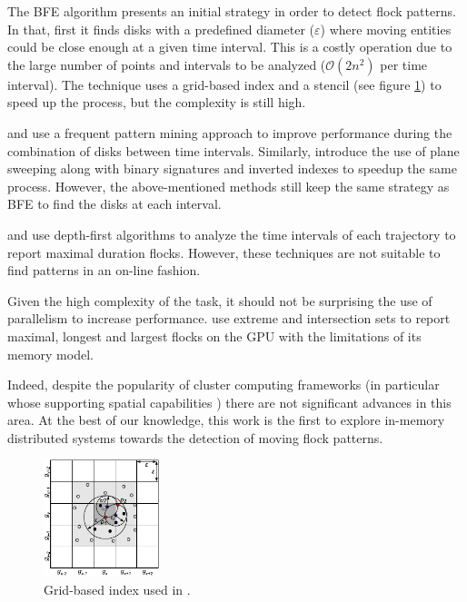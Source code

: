 \documentclass[12pt]{scrartcl}
\begin{document}
The BFE algorithm presents an initial strategy in order to detect flock patterns.  In that, first it finds disks with a predefined diameter ($\varepsilon$) where moving entities could be close enough at a given time interval.  This is a costly operation due to the large number of points and intervals to be analyzed ($\mathcal{O}(2n^2)$ per time interval).  The technique uses a grid-based index and a stencil (see figure \ref{fig:grid}) to speed up the process, but the complexity is still high.

\cite{calderon_romero_mining_2011} and \cite{turdukulov_visual_2014} use a frequent pattern mining approach to improve performance during the combination of disks between time intervals.  Similarly, \cite{tanaka_improved_2016} introduce the use of plane sweeping along with binary signatures and inverted indexes to speedup the same process.  However, the above-mentioned methods still keep the same strategy as BFE to find the disks at each interval.  

\cite{arimura_finding_2014} and \cite{geng_enumeration_2014} use depth-first algorithms to analyze the time intervals of each trajectory to report maximal duration flocks.  However, these techniques are not suitable to find patterns in an on-line fashion.

Given the high complexity of the task, it should not be surprising the use of parallelism to increase performance.  \cite{fort_parallel_2014} use extreme and intersection sets to report maximal, longest and largest flocks on the GPU with the limitations of its memory model.  

Indeed, despite the popularity of cluster computing frameworks (in particular whose supporting spatial capabilities \citep{eldawy_spatialhadoop:_2014, yu_demonstration_2016, pellechia_geomesa:_2015-1, xie_simba:_2016-1}) there are not significant advances in this area.  At the best of our knowledge, this work is the first to explore in-memory distributed systems towards the detection of moving flock patterns.

\begin{figure}
 \centering
 \includegraphics[width=0.3\textwidth]{./figures/grid}
 \caption{Grid-based index used in \cite{vieira_-line_2009}.}
 \label{fig:grid}
\end{figure}
\end{document}
